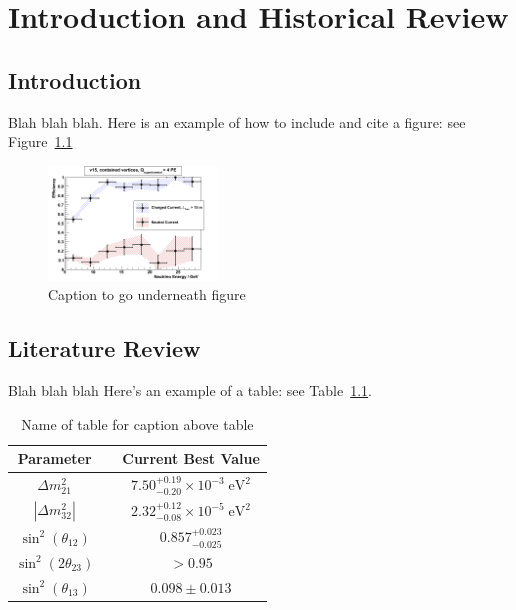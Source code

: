 \chapter{Introduction and Historical Review}
\newpage

\section{Introduction}
Blah blah blah. Here is an example of how to include and cite a figure: see Figure~\ref{fig:example_figure}
\begin{figure}[H]
\center\includegraphics[width=0.4\textwidth]{figures/ExampleFigure.png}
\caption[Caption to go in list of figures]{Caption to go underneath figure}
\label{fig:example_figure}
\end{figure}

\section{Literature Review}
Blah blah blah Here's an example of a table: see Table~\ref{tab:best_values}.

\begin{table}[H]
\centering\onehalfspacing
\vline
\begin{tabular}{c c c}
\hline
\textbf{Parameter} & \vline & \textbf{Current Best Value}\\
\hline
$\Delta m^2_{21}$ & \vline & $7.50^{+0.19}_{-0.20} \times 10^{-3}\;\mathrm{eV}^2$\\
$|\Delta m^2_{32}|$ & \vline & $2.32^{+0.12}_{-0.08} \times 10^{-5}\;\mathrm{eV}^2$\\
$\sin^2{(\theta_{12})}$ & \vline & $0.857^{+0.023}_{-0.025}$\\
$\sin^2{(2\theta_{23})}$ & \vline & $>0.95$\\
$\sin^2{(\theta_{13})}$ & \vline &  $0.098\pm 0.013$\\
\hline\end{tabular}\vline
\captionsetup{width=0.86\textwidth}
\caption[Names of table for list of tables]{Name of table for caption above table}
\label{tab:best_values}
\end{table}

